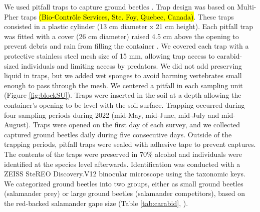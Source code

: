 We used pitfall traps to capture ground beetles \citep{baarsCatchesPitfallTraps1979,spenceSamplingCarabidAssemblages1994a,loveiEcologyBehaviorGround1996,kotzeFortyYearsCarabid2011a,knappEffectPitfallTrap2012}. 
Trap design was based on Multi-Pher traps \hl{(Bio-Contrôle Services, Ste. Foy, Quebec, Canada)}. 
These traps consisted in a plastic cylinder (13 cm diameter x 21 cm height). 
Each pitfall trap was fitted with a cover (26 cm diameter) raised 4.5 cm above the opening to prevent debris and rain from filling the container \citep{Jobin1988MultiPherinsect,Moore2004Effectstwo,bouchardBeetleCommunityResponse2016b}. 
We covered each trap with a protective stainless steel mesh size of 15 mm, allowing trap access to carabid-sized individuals and limiting access by predators.  
We did not add preserving liquid in traps, but we added wet sponges to avoid harming vertebrates small enough to pass through the mesh. 
We centered a pitfall in each sampling unit (Figure \ref{fig:blockSU}). 
Traps were inserted in the soil at a depth allowing the container’s opening to be level with the soil surface. 
Trapping occurred during four sampling periods during 2022 (mid-May, mid-June, mid-July and mid-August). 
Traps were opened on the first day of each survey, and we collected captured ground beetles daily during five consecutive days. 
Outside of the trapping periods, pitfall traps were sealed with adhesive tape to prevent captures. 
The contents of the traps were preserved in 70\% alcohol and individuals were identified at the species level afterwards. 
Identification was conducted with a ZEISS SteREO Discovery.V12 binocular microscope using the \cite{larochelleManuelIdentificationCarabidae1976} taxonomic keys. 
We categorized ground beetles into two groups, either as small ground beetles (salamander prey) or large ground beetles (salamander competitors), based on the red-backed salamander gape size (Table \ref{tab:carabid}, \citealp{jaegerFoodLimitedResource1972,magliaModulationPreycaptureBehavior1995,magliaOntogenyFeedingEcology1996}).

